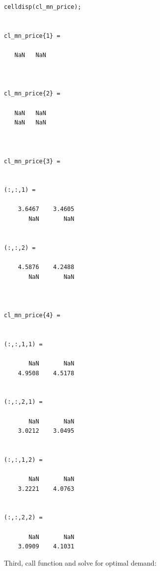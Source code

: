 \documentclass[
]{book}
\begin{document}
\begin{verbatim}
celldisp(cl_mn_price);


cl_mn_price{1} =
 
   NaN   NaN



cl_mn_price{2} =
 
   NaN   NaN
   NaN   NaN



cl_mn_price{3} =
 

(:,:,1) =

    3.6467    3.4605
       NaN       NaN


(:,:,2) =

    4.5876    4.2488
       NaN       NaN



cl_mn_price{4} =
 

(:,:,1,1) =

       NaN       NaN
    4.9508    4.5178


(:,:,2,1) =

       NaN       NaN
    3.0212    3.0495


(:,:,1,2) =

       NaN       NaN
    3.2221    4.0763


(:,:,2,2) =

       NaN       NaN
    3.0909    4.1031
\end{verbatim}

Third, call function and solve for optimal demand:
\end{document}
